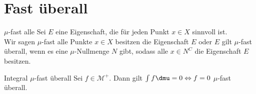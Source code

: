 \section{Fast überall}

\begin{karte}{\(\mu\)-fast alle}
	Sei \(E\) eine Eigenschaft, die für jeden Punkt \(x\in X\) sinnvoll ist.\\
	Wir sagen \( \mu \)-fast alle Punkte \(x\in X\) besitzen die Eigenschaft \(E\) 
	oder \(E\) gilt \(\mu\)-fast überall, wenn es eine \(\mu\)-Nullmenge \(N\) gibt, 
	sodass alle \(x \in N^C\) die Eigenschaft \(E\) besitzen.
\end{karte}

\begin{karte}{Integral \(\mu\)-fast überall}
	Sei \(f \in \mathcal{M}^+\). Dann gilt \( \int f \dmu = 0 \Leftrightarrow f = 0 \) \(\mu\)-fast überall.
\end{karte}